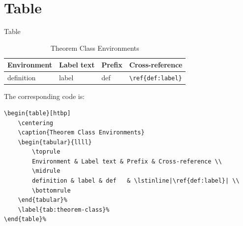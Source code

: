 \documentclass[11pt]{elegantbook}
\begin{document}
\section{Table}
Table
\begin{table}[htbp]
	\centering
	\caption{Theorem Class Environments}
	\begin{tabular}{llll}
		\toprule
		Environment & Label text & Prefix & Cross-reference \\
		\midrule
		definition & label & def   & \lstinline|\ref{def:label}| \\
		\bottomrule
	\end{tabular}
	\label{tab:theorem-class}
\end{table}
The corresponding code is: 
\begin{lstlisting}
\begin{table}[htbp]
	\centering
	\caption{Theorem Class Environments}
	\begin{tabular}{llll}
		\toprule
		Environment & Label text & Prefix & Cross-reference \\
		\midrule
		definition & label & def   & \lstinline|\ref{def:label}| \\
		\bottomrule
	\end{tabular}%
	\label{tab:theorem-class}%
\end{table}%
\end{lstlisting}
\end{document}
